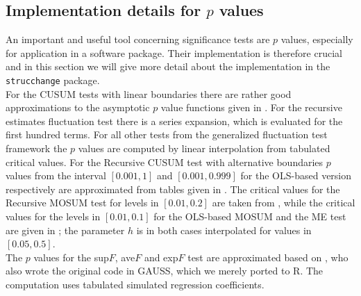 \documentclass[10pt,a4paper]{article}
\begin{document}



\newpage
\begin{appendix}
\section{Implementation details for $p$ values}

An important and useful tool concerning significance tests are $p$ values,
especially for application in a software package. Their implementation is
therefore crucial and in this section we will give more detail about the
implementation in the {\tt strucchange} package.\\

For the CUSUM tests with linear boundaries there are rather good
approximations to the asymptotic $p$ value functions given in
\cite{Zo:Zeileis:2000a}. For the recursive estimates fluctuation test
there is a series expansion, which is evaluated for the first hundred terms. For
all other tests from the generalized fluctuation test framework the $p$ values
are computed by linear interpolation from tabulated critical values. For the
Recursive CUSUM test with alternative boundaries $p$ values from the interval
$[0.001, 1]$ and $[0.001, 0.999]$ for the OLS-based version respectively are
approximated from tables given in \cite{Zo:Zeileis:2000}. The critical values
for the Recursive MOSUM test for levels in $[0.01, 0.2]$ are taken from
\cite{Z:Chu+Hornik+Kuan:1995}, while the critical values for the levels
in $[0.01, 0.1]$ for the OLS-based MOSUM and the ME test are given in
\cite{Z:Chu+Hornik+Kuan:1995a}; the parameter $h$ is in both cases interpolated
for values in $[0.05, 0.5]$.\\

The $p$ values for the sup$F$, ave$F$ and exp$F$ test are approximated based on
\cite{Z:Hansen:1997}, who also wrote the original code in \textsf{GAUSS}, which
we merely ported to \textsf{R}. The computation uses tabulated simulated
regression coefficients.

\end{appendix}
\end{document}
